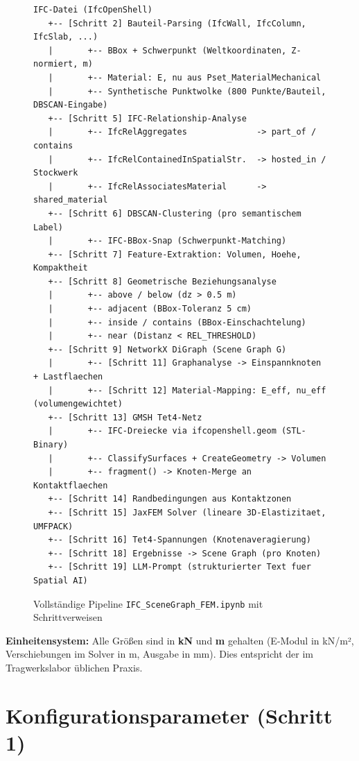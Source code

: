 \documentclass[a4paper,11pt]{article}
\begin{document}
\begin{figure}[H]
\centering
\begin{minipage}{0.95\textwidth}
\begin{lstlisting}[style=plain]
IFC-Datei (IfcOpenShell)
   +-- [Schritt 2] Bauteil-Parsing (IfcWall, IfcColumn, IfcSlab, ...)
   |       +-- BBox + Schwerpunkt (Weltkoordinaten, Z-normiert, m)
   |       +-- Material: E, nu aus Pset_MaterialMechanical
   |       +-- Synthetische Punktwolke (800 Punkte/Bauteil, DBSCAN-Eingabe)
   +-- [Schritt 5] IFC-Relationship-Analyse
   |       +-- IfcRelAggregates              -> part_of / contains
   |       +-- IfcRelContainedInSpatialStr.  -> hosted_in / Stockwerk
   |       +-- IfcRelAssociatesMaterial      -> shared_material
   +-- [Schritt 6] DBSCAN-Clustering (pro semantischem Label)
   |       +-- IFC-BBox-Snap (Schwerpunkt-Matching)
   +-- [Schritt 7] Feature-Extraktion: Volumen, Hoehe, Kompaktheit
   +-- [Schritt 8] Geometrische Beziehungsanalyse
   |       +-- above / below (dz > 0.5 m)
   |       +-- adjacent (BBox-Toleranz 5 cm)
   |       +-- inside / contains (BBox-Einschachtelung)
   |       +-- near (Distanz < REL_THRESHOLD)
   +-- [Schritt 9] NetworkX DiGraph (Scene Graph G)
   |       +-- [Schritt 11] Graphanalyse -> Einspannknoten + Lastflaechen
   |       +-- [Schritt 12] Material-Mapping: E_eff, nu_eff (volumengewichtet)
   +-- [Schritt 13] GMSH Tet4-Netz
   |       +-- IFC-Dreiecke via ifcopenshell.geom (STL-Binary)
   |       +-- ClassifySurfaces + CreateGeometry -> Volumen
   |       +-- fragment() -> Knoten-Merge an Kontaktflaechen
   +-- [Schritt 14] Randbedingungen aus Kontaktzonen
   +-- [Schritt 15] JaxFEM Solver (lineare 3D-Elastizitaet, UMFPACK)
   +-- [Schritt 16] Tet4-Spannungen (Knotenaveragierung)
   +-- [Schritt 18] Ergebnisse -> Scene Graph (pro Knoten)
   +-- [Schritt 19] LLM-Prompt (strukturierter Text fuer Spatial AI)
\end{lstlisting}
\end{minipage}
\caption{Vollständige Pipeline \texttt{IFC\_SceneGraph\_FEM.ipynb} mit Schrittverweisen}
\end{figure}

\textbf{Einheitensystem:} Alle Größen sind in \textbf{kN} und \textbf{m} gehalten (E-Modul in kN/m², Verschiebungen im Solver in m, Ausgabe in mm). Dies entspricht der im Tragwerkslabor üblichen Praxis.

\section{Konfigurationsparameter (Schritt 1)}
\label{sec:config}
\end{document}
